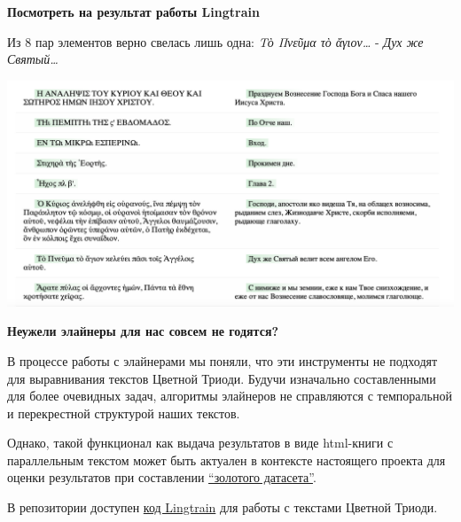 \documentclass[
  letterpaper,
]{book}
\begin{document}
\begin{tcolorbox}[enhanced jigsaw, opacityback=0, toprule=.15mm, breakable, arc=.35mm, colback=white, left=2mm, bottomrule=.15mm, leftrule=.75mm, colframe=quarto-callout-caution-color-frame, rightrule=.15mm]

\textbf{Посмотреть на результат работы Lingtrain}\vspace{2mm}

Из 8 пар элементов верно свелась лишь одна: \emph{Τὸ Πνεῦμα τὸ
ἄγιον\ldots{}} - \emph{Дух же Святый\ldots{}}

\includegraphics{images/lingtrain_faulty_result.png}

\end{tcolorbox}

\begin{tcolorbox}[enhanced jigsaw, opacityback=0, toprule=.15mm, breakable, arc=.35mm, colback=white, left=2mm, bottomrule=.15mm, leftrule=.75mm, colframe=quarto-callout-note-color-frame, rightrule=.15mm]

\textbf{Неужели элайнеры для нас совсем не годятся?}\vspace{2mm}

В процессе работы с элайнерами мы поняли, что эти инструменты не
подходят для выравнивания текстов Цветной Триоди. Будучи изначально
составленными для более очевидных задач, алгоритмы элайнеров не
справляются с темпоральной и перекрестной структурой наших текстов.

Однако, такой функционал как выдача результатов в виде html-книги с
параллельным текстом может быть актуален в контексте настоящего проекта
для оценки результатов при составлении
\protect\hyperlink{sec-about_evluation}{``золотого датасета''}.

\end{tcolorbox}

В репозитории доступен
\href{https://github.com/Drozhzhinastya/GSPC/blob/main/scripts/aligners/Lingtrain_LABse.ipynb}{код
Lingtrain} для работы с текстами Цветной Триоди.
\end{document}
